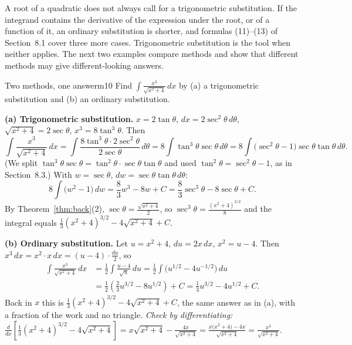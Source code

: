 \documentclass[11pt]{article}
\begin{document}
A root of a quadratic does not always call for a trigonometric substitution. If the integrand contains the derivative of the expression under the root, or of a function of it, an ordinary substitution is shorter, and formulas (11)--(13) of Section~8.1 cover three more cases. Trigonometric substitution is the tool when neither applies. The next two examples compare methods and show that different methods may give different-looking answers.

\begin{exmp}{Two methods, one answer}{m10}
Find $\displaystyle\int\frac{x^3}{\sqrt{x^2+4}}\,dx$ by (a) a trigonometric substitution and (b) an ordinary substitution.

\textbf{(a) Trigonometric substitution.} $x=2\tan\theta$, $dx=2\sec^2\theta\,d\theta$, $\sqrt{x^2+4}=2\sec\theta$, $x^3=8\tan^3\theta$. Then
\[\int\frac{x^3}{\sqrt{x^2+4}}\,dx=\int\frac{8\tan^3\theta\cdot2\sec^2\theta}{2\sec\theta}\,d\theta=8\int\tan^3\theta\sec\theta\,d\theta=8\int\big(\sec^2\theta-1\big)\sec\theta\tan\theta\,d\theta .\]
(We split $\tan^3\theta\sec\theta=\tan^2\theta\cdot\sec\theta\tan\theta$ and used $\tan^2\theta=\sec^2\theta-1$, as in Section~8.3.) With $w=\sec\theta$, $dw=\sec\theta\tan\theta\,d\theta$:
\[8\int\big(w^2-1\big)\,dw=\frac83w^3-8w+C=\frac83\sec^3\theta-8\sec\theta+C .\]
By Theorem~\ref{thm:back}(2), $\sec\theta=\frac{\sqrt{x^2+4}}2$, so $\sec^3\theta=\frac{(x^2+4)^{3/2}}8$ and the integral equals $\frac13(x^2+4)^{3/2}-4\sqrt{x^2+4}+C$.

\textbf{(b) Ordinary substitution.} Let $u=x^2+4$, $du=2x\,dx$, $x^2=u-4$. Then $x^3\,dx=x^2\cdot x\,dx=(u-4)\cdot\frac{du}2$, so
\begin{align*}
\int\frac{x^3}{\sqrt{x^2+4}}\,dx&=\frac12\int\frac{u-4}{\sqrt u}\,du=\frac12\int\big(u^{1/2}-4u^{-1/2}\big)\,du\\
&=\frac12\left(\frac23u^{3/2}-8u^{1/2}\right)+C=\frac13u^{3/2}-4u^{1/2}+C .
\end{align*}
Back in $x$ this is $\frac13(x^2+4)^{3/2}-4\sqrt{x^2+4}+C$, the same answer as in (a), with a fraction of the work and no triangle. \emph{Check by differentiating:} $\frac{d}{dx}\left[\frac13(x^2+4)^{3/2}-4\sqrt{x^2+4}\right]=x\sqrt{x^2+4}-\frac{4x}{\sqrt{x^2+4}}=\frac{x\big(x^2+4\big)-4x}{\sqrt{x^2+4}}=\frac{x^3}{\sqrt{x^2+4}}$.
\end{exmp}
\end{document}
